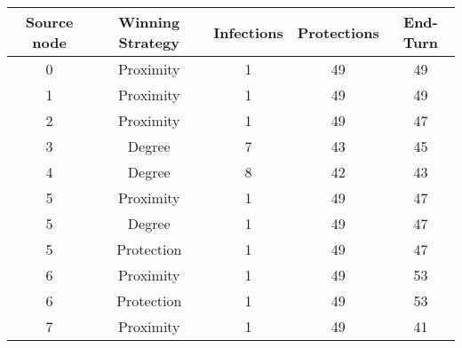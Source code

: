 \documentclass[results.tex]{subfiles}
\begin{document}
    \begin{center}
        \begin{tabular}{| c || c | c | c | c |}
            \hline
            {\bfseries Source node} & {\bfseries Winning Strategy} & {\bfseries Infections} & {\bfseries Protections}
            & {\bfseries End-Turn}
            \\  %
            \hline\hline
            0                       & Proximity                    & 1                      & 49                      & 49                   \\
            \hline
            1                       & Proximity                    & 1                      & 49                      & 49                   \\
            \hline
            2                       & Proximity                    & 1                      & 49                      & 47                   \\
            \hline
            3                       & Degree                       & 7                      & 43                      & 45                   \\
            \hline
            4                       & Degree                       & 8                      & 42                      & 43                   \\
            \hline
            5                       & Proximity                    & 1                      & 49                      & 47                   \\
            \hline
            5                       & Degree                       & 1                      & 49                      & 47                   \\
            \hline
            5                       & Protection                   & 1                      & 49                      & 47                   \\
            \hline
            6                       & Proximity                    & 1                      & 49                      & 53                   \\
            \hline
            6                       & Protection                   & 1                      & 49                      & 53                   \\
            \hline
            7                       & Proximity                    & 1                      & 49                      & 41                   \\

\end{tabular}
\end{center}
\end{document}
